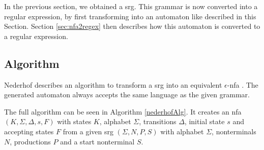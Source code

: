 In the previous section, we obtained a \acl{srg}. This grammar is now converted into a regular expression, by first transforming into an automaton like described in this Section. Section \ref{sec:nfa2regex} then describes how this automaton is converted to a regular expression.

\subsection{Algorithm}

Nederhof describes an algorithm to transform a \ac{srg} into an equivalent $\epsilon$-\ac{nfa} \cite{nederhof}. The generated automaton always accepts the same language as the given grammar.

The full algorithm can be seen in Algorithm \ref{nederhofAlg}. It creates an \ac{nfa} $(K,\Sigma, \Delta, s, F)$ with states $K$, alphabet $\Sigma$, transitions $\Delta$, initial state $s$ and accepting states $F$ from a given \ac{srg} $(\Sigma, N, P, S)$ with alphabet $\Sigma$, nonterminals $N$, productions $P$ and a start nonterminal $S$.

